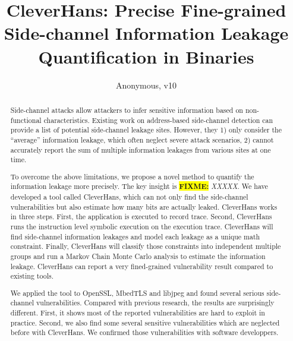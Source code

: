\documentclass[conference]{IEEEtran}
\newcommand{\highlight}[1]{\colorbox{yellow}{\textbf{#1}}}
\newcommand{\fixme}[1]{\highlight{FIXME:} \emph{#1}}
\newcommand{\tool}{TANA}
\renewcommand{\tool}{CleverHans}
\begin{document}
\title{\tool{}: Precise Fine-grained Side-channel Information Leakage Quantification in Binaries}
\author{Anonymous, v10}

\maketitle

\begin{abstract}
    Side-channel attacks allow attackers to infer sensitive 
    information based on non-functional characteristics. 
    Existing work on address-based side-channel detection 
    can provide a list of potential side-channel leakage sites. However, they 
    1) only consider the ``average'' information leakage, 
    which often neglect severe attack scenarios,
    2) cannot accurately report
    the sum of multiple information leakages from various sites at one time.
       
    To overcome the above limitations, we propose a novel method
    to quantify the information leakage more precisely.  
    The key insight is \fixme{XXXXX}.
    We have developed a tool called \tool{}, which can not only 
    find the side-channel vulnerabilities but also estimate how many bits are actually leaked. 
    \tool{} works in three steps. First, the application is executed to record 
    trace. Second, \tool{} runs the instruction level symbolic execution on the 
    execution trace. \tool{} will find side-channel information leakages and model each leakage 
    as a unique math constraint. Finally, \tool{} will classify those constraints into 
    independent multiple groups and run a Markov Chain Monte Carlo analysis to estimate the 
    information leakage. \tool{} can report a very fined-grained vulnerability result 
    compared to existing tools.
    
    We applied the tool to OpenSSL, MbedTLS and libjpeg and found several serious side-channel 
    vulnerabilities. Compared with previous research, the results are surprisingly different. 
    First, it shows most of the reported vulnerabilities are hard to exploit in practice. 
    Second, we also find some several sensitive vulnerabilities which are neglected before with \tool{}. 
    We confirmed those vulnerabilities with software developpers.

\end{abstract}

\IEEEpeerreviewmaketitle
{}














\end{document}
